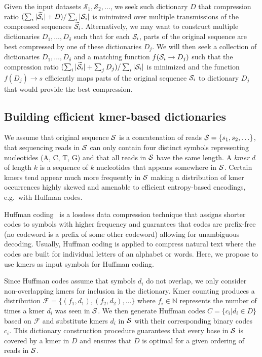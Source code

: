 \documentclass[12pt]{cmuthesis}
\makeatletter
\newcommand{\eg}{e.g.\@}
\makeatother
\begin{document}
  Given the input datasets $\mathcal{ S}_1, \mathcal{ S}_2, \ldots$, we seek such dictionary $D$ that compression ratio $(\sum_i |\widetilde{\mathcal{S}}_i| + D) / \sum_i |\mathcal{S}_i|$ is minimized over multiple transmissions of the compressed sequences $\widetilde{\mathcal{S}}_i$. Alternatively, we may want to construct multiple dictionaries $D_1, \ldots, D_\delta$ such that for each $\mathcal{S}_i$, parts of the original sequence are best compressed by one of these dictionaries $D_j$. We will then seek a collection of dictionaries $D_1, \ldots, D_\delta$ and a matching function $f(\mathcal{S}_i \to D_j)$ such that the compression ratio $(\sum_i |\widetilde{\mathcal{S}}_i| + \sum_j D_j) / \sum_i |\mathcal{S}_i|$ is minimized and the function $f(D_j) \to s$ efficiently maps parts of the original sequence $\mathcal{S}_i$ to dictionary $D_j$ that would provide the best compression.

\subsection{Building efficient kmer-based dictionaries}

We assume that original sequence $\mathcal{S}$ is a concatenation of reads $\mathcal{S} = \{s_1, s_2, \ldots \}$, that sequencing reads in $\mathcal{S}$ can only contain four distinct symbols representing nucleotides (A, C, T, G) and that all reads in $\mathcal{S}$ have the same length. A \textit{kmer} $d$ of length $k$ is a sequence of $k$ nucleotides that appears somewhere in $\mathcal{S}$. 
Certain kmers tend appear much more frequently in $\mathcal{S}$ making a distribution of kmer occurrences highly skewed and amenable to efficient entropy-based encodings, \eg~with Huffman codes.

Huffman coding~\cite{Huffman1952} is a lossless data compression technique that assigns shorter codes to symbols with higher frequency and guarantees that codes are prefix-free (no codeword is a prefix of some other codeword) allowing for unambiguous decoding. 
Usually, Huffman coding is applied to compress natural text where the codes are built for individual letters of an alphabet or words. Here, we propose to use kmers as input symbols for Huffman coding.

Since Huffman codes assume that symbols $d_i$ do not overlap, we only consider non-overlapping kmers for inclusion in the dictionary. Kmer counting produces a distribution $\mathcal{F} = \{(f_1, d_1), (f_2, d_2), \ldots \}$ where $f_i \in \mathbb{N}$ represents the number of times a kmer $d_i$ was seen in $\mathcal{S}$. We then generate Huffman codes $C = \{ c_i | d_i \in D \}$ based on $\mathcal{F}$ and substitute kmers $d_i$ in $\mathcal{S}$ with their corresponding binary codes $c_i$. This dictionary construction procedure guarantees that every base in $\mathcal{S}$ is covered by a kmer in $D$ and ensures that $D$ is optimal for a given ordering of reads in $\mathcal{S}$.
\end{document}
